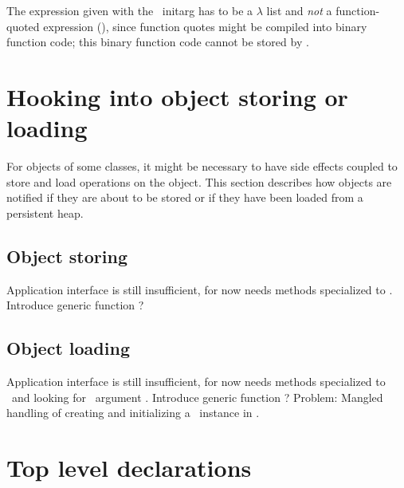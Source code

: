 The expression given with the \ initarg has to be a
$\lambda$ list and \emph{not} a function-quoted expression
(), since function quotes might be compiled into
binary function code; this binary function code cannot be stored by
\plobwoexcl.

\section{Hooking into object storing or loading}%
\label{sec:HookIntoTransfer}

For objects of some classes, it might be necessary to have side
effects coupled to store and load operations on the object. This
section describes how objects are notified if they are about to be
stored or if they have been loaded from a persistent heap.

\subsection{Object storing}

\think{}Application interface is still insufficient, for now needs
methods specialized to . Introduce generic
function ?

\subsection{Object loading}

\think{}Application interface is still insufficient, for now needs
methods specialized to \ and looking for
\ argument . Introduce generic function
? Problem: Mangled handling of creating and
initializing a \clos\ instance in .

\section{Top level declarations}%
\label{sec:ToplevelDeclarations}


